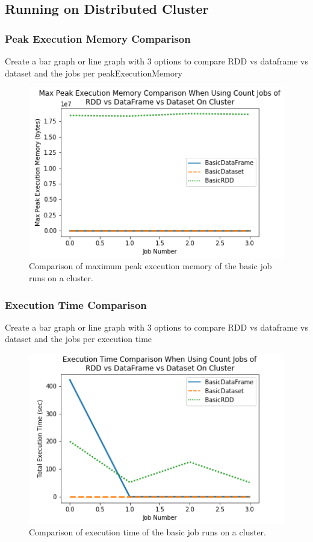 \documentclass[conference]{IEEEtran}
\begin{document}
\subsection{Running on Distributed Cluster}
\subsubsection{Peak Execution Memory Comparison}
Create a bar graph or line graph with 3 options to compare RDD vs dataframe vs dataset and the jobs per peakExecutionMemory
\begin{figure}
    \includegraphics[width=\linewidth]{../python_scripts/images/basicJobsMaxPeakExecutionMemoryCluster.png}
    \caption{Comparison of maximum peak execution memory of the basic job runs on a cluster.}
    \label{fig:basicJobsMaxPeakExecutionMemoryCluster}
\end{figure}

\subsubsection{Execution Time Comparison}
Create a bar graph or line graph with 3 options to compare RDD vs dataframe vs dataset and the jobs per execution time
\begin{figure}
    \includegraphics[width=\linewidth]{../python_scripts/images/basicJobsAllExecutionTimeCluster.png}
    \caption{Comparison of execution time of the basic job runs on a cluster.}
    \label{fig:basicJobsAllExecutionTimeCluster}
\end{figure}
\end{document}
